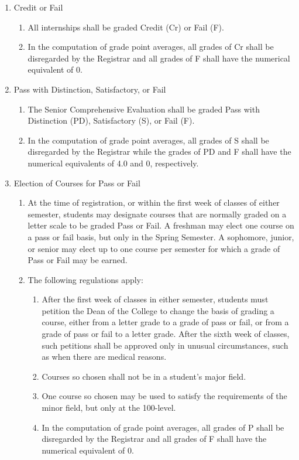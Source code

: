 \documentclass{manual}
\newcommand{\itemLevelA}{\alph*.}
\newcommand{\itemLevelB}{\arabic*)}
\newcommand{\itemLevelC}{\alph*)}
\newcommand{\itemRefA}{\alph*}
\newcommand{\itemRefB}{\arabic*}
\newcommand{\itemRefC}{\alph*}
\begin{document}
\begin{enumerate}[label=\itemLevelA,ref=\itemRefA]
				\item Credit or Fail

					\begin{enumerate}[label=\itemLevelB,ref=\itemRefB]
					\item All internships shall be graded Credit (Cr) or Fail (F). 
					\item In the computation of grade point averages, all grades of Cr shall be disregarded by the Registrar and all grades of F shall have the numerical equivalent of 0. 
					\end{enumerate}
				
				\item Pass with Distinction, Satisfactory, or Fail

					\begin{enumerate}[label=\itemLevelB,ref=\itemRefB]
					\item The Senior Comprehensive Evaluation shall be graded Pass with Distinction (PD), Satisfactory (S), or Fail (F). 
					\item In the computation of grade point averages, all grades of S shall be disregarded by the Registrar while the grades of PD and F shall have the numerical equivalents of 4.0 and 0, respectively.
					\end{enumerate}
				
				\item Election of Courses for Pass or Fail

					\begin{enumerate}[label=\itemLevelB,ref=\itemRefB]
					\item At the time of registration, or within the first week of classes of either semester, students may designate courses that are normally graded on a letter scale to be graded Pass or Fail. A freshman may elect one course on a pass or fail basis, but only in the Spring Semester. A sophomore, junior, or senior may elect up to one course per semester for which a grade of Pass or Fail may be earned. 
					\item The following regulations apply:

						\begin{enumerate}[label=\itemLevelC,ref=\itemRefC]
						\item After the first week of classes in either semester, students must petition the Dean of the College to change the basis of grading a course, either from a letter grade to a grade of pass or fail, or from a grade of pass or fail to a letter grade. After the sixth week of classes, such petitions shall be approved only in unusual circumstances, such as when there are medical reasons. 
						\item Courses so chosen shall not be in a student's major field. 
						\item One course so chosen may be used to satisfy the requirements of the minor field, but only at the 100-level. 
						\item In the computation of grade point averages, all grades of P shall be disregarded by the Registrar and all grades of F shall have the numerical equivalent of 0. 
						\end{enumerate}
				

\end{enumerate}
\end{enumerate}
\end{document}

